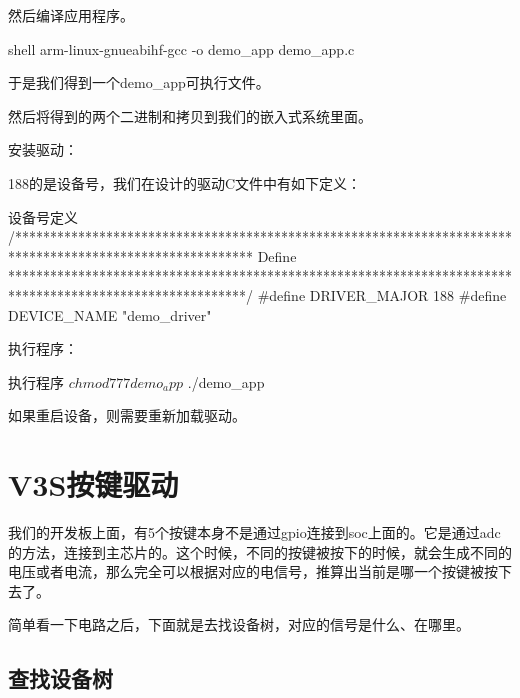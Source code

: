 \documentclass[lang=cn,newtx,10pt,scheme=chinese]{elegantbook}
\begin{document}
然后编译应用程序。

\begin{mycode}{shell}
arm-linux-gnueabihf-gcc -o demo_app demo_app.c
\end{mycode}

于是我们得到一个demo\_app可执行文件。

然后将得到的两个二进制和拷贝到我们的嵌入式系统里面。

安装驱动：


188的是设备号，我们在设计的驱动C文件中有如下定义：

\begin{mycode}{设备号定义}
/**********************************************************************************************************
Define
**********************************************************************************************************/
#define    DRIVER_MAJOR     188
#define    DEVICE_NAME     "demo_driver"
\end{mycode}

执行程序：

\begin{mycode}{执行程序}
$ chmod 777 demo_app
$ ./demo_app
\end{mycode}

\begin{marker}
    如果重启设备，则需要重新加载驱动。
\end{marker}

\chapter{V3S按键驱动}

我们的开发板上面，有5个按键本身不是通过gpio连接到soc上面的。它是通过adc的方法，连接到主芯片的。这个时候，不同的按键被按下的时候，就会生成不同的电压或者电流，那么完全可以根据对应的电信号，推算出当前是哪一个按键被按下去了。

简单看一下电路之后，下面就是去找设备树，对应的信号是什么、在哪里。

\section{查找设备树}
\end{document}
